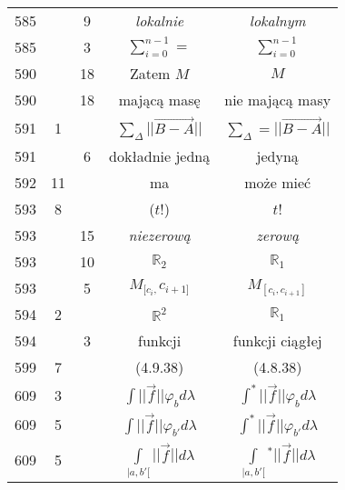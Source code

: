 \documentclass[a4paper]{article}
\newcommand{\mb}{\mathbb}
\newcommand{\R}{\mb{R}}
\newcommand{\Sum}{\sum\limits}
\newcommand{\IntL}{\int\limits}
\newcommand{\la}{\lambda}
\newcommand{\vp}{\varphi}
\newcommand{\ora}{\overrightarrow}
\begin{document}
\begin{center}
\begin{tabular}{|c|c|c|c|c|}
    585 & & 9 & \emph{lokalnie} & \emph{lokalnym} \\
    585 & & 3 & $\Sum_{ i = 0 }^{ n - 1 } =$
           & $\Sum_{ i = 0 }^{ n - 1 }$ \\
    590 & & 18 & Zatem $M$ & $M$ \\
    590 & & 18 & mającą masę & nie mającą masy \\
    591 & 1 & & $\Sum_{ \Delta } || \ora{ B - A } ||$
           & $\Sum_{ \Delta } = || \ora{ B - A } ||$ \\
    591 & & 6 & dokładnie jedną & jedyną \\
    592 & 11 & & ma & może mieć \\
    593 & 8 & & ($ t $!) & $ t $! \\
    593 & & 15 & \emph{niezerową} & \emph{zerową} \\
    593 & & 10 & $\R_{ 2 }$ & $\R_{ 1 }$ \\
    593 & & 5 & $M_{ [ c_{ i }, } c_{ i + 1 ] }$
           & $M_{ [ c_{ i }, c_{ i + 1 } ] }$ \\
    594 & 2 & & $\R^{ 2 }$ & $\R_{ 1 }$ \\
    594 & & 3 & funkcji & funkcji ciągłej \\
    599 & 7 & & (4.9.38) & (4.8.38) \\
    609 & 3 & & $\int || \vec{ f } || \vp_{ b } d\la$
           & $\int^{ * } || \vec{ f } || \vp_{ b } d\la$ \\
    609 & 5 & & $\int || \vec{ f } || \vp_{ b' } d\la$
           & $\int^{ * } || \vec{ f } || \vp_{ b' } d\la$ \\
    609 & 5 & & $\IntL_{ | a, b' [ } || \vec{ f } || d\la$
           & $\IntL_{ | a, b' [ }{^{ * }}
             || \vec{ f } || d\la$ \\ \hline
  \end{tabular}


\end{center}
\end{document}
